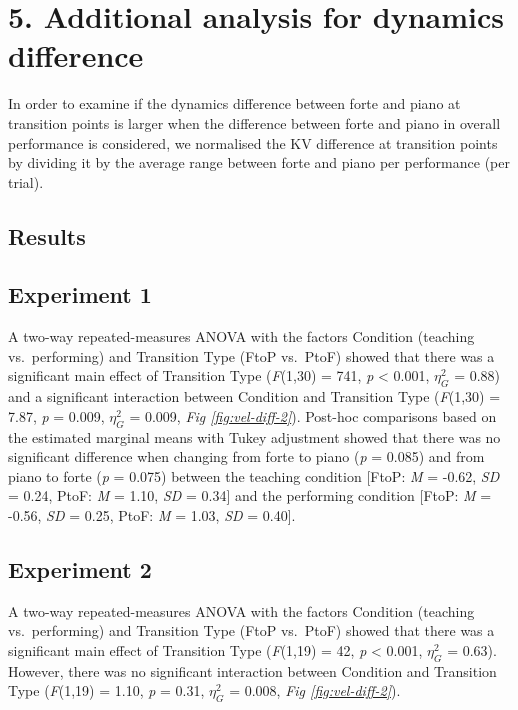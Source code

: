\documentclass[
  man,floatsintext]{apa6}
\begin{document}
\clearpage

\hypertarget{additional-analysis-for-dynamics-difference}{%
\section{5. Additional analysis for dynamics difference}\label{additional-analysis-for-dynamics-difference}}

In order to examine if the dynamics difference between forte and piano at transition points is larger when the difference between forte and piano in overall performance is considered, we normalised the KV difference at transition points by dividing it by the average range between forte and piano per performance (per trial).

\hypertarget{results-4}{%
\subsection{Results}\label{results-4}}

\hypertarget{experiment-1-5}{%
\subsection{Experiment 1}\label{experiment-1-5}}

A two-way repeated-measures ANOVA with the factors Condition (teaching vs.~performing) and Transition Type (FtoP vs.~PtoF) showed that there was a significant main effect of Transition Type (\emph{F}(1,30) = 741, \emph{p} \textless{} 0.001, \(\eta_G^2\) = 0.88) and a significant interaction between Condition and Transition Type (\emph{F}(1,30) = 7.87, \emph{p} = 0.009, \(\eta_G^2\) = 0.009, \emph{Fig \ref{fig:vel-diff-2}}). Post-hoc comparisons based on the estimated marginal means with Tukey adjustment showed that there was no significant difference when changing from forte to piano (\emph{p} = 0.085) and from piano to forte (\emph{p} = 0.075) between the teaching condition {[}FtoP: \emph{M} = -0.62, \emph{SD} = 0.24, PtoF: \emph{M} = 1.10, \emph{SD} = 0.34{]} and the performing condition {[}FtoP: \emph{M} = -0.56, \emph{SD} = 0.25, PtoF: \emph{M} = 1.03, \emph{SD} = 0.40{]}.

\hypertarget{experiment-2-5}{%
\subsection{Experiment 2}\label{experiment-2-5}}

A two-way repeated-measures ANOVA with the factors Condition (teaching vs.~performing) and Transition Type (FtoP vs.~PtoF) showed that there was a significant main effect of Transition Type (\emph{F}(1,19) = 42, \emph{p} \textless{} 0.001, \(\eta_G^2\) = 0.63). However, there was no significant interaction between Condition and Transition Type (\emph{F}(1,19) = 1.10, \emph{p} = 0.31, \(\eta_G^2\) = 0.008, \emph{Fig \ref{fig:vel-diff-2}}).
\end{document}
